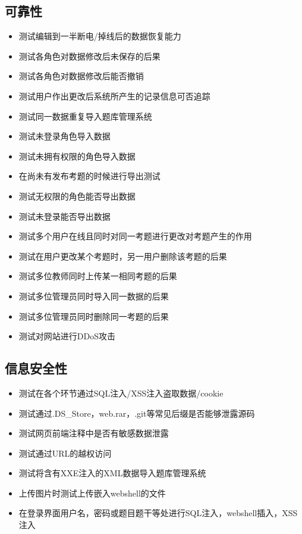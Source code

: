 \documentclass[hyperref, a4paper]{ctexart}
\providecommand{\tightlist}{%
  \setlength{\itemsep}{0pt}\setlength{\parskip}{0pt}}
\begin{document}
\hypertarget{ux53efux9760ux6027}{%
\subsection{可靠性}\label{ux53efux9760ux6027}}

\begin{itemize}
\tightlist
\item
  测试编辑到一半断电/掉线后的数据恢复能力
\item
  测试各角色对数据修改后未保存的后果
\item
  测试各角色对数据修改后能否撤销
\item
  测试用户作出更改后系统所产生的记录信息可否追踪
\item
  测试同一数据重复导入题库管理系统
\item
  测试未登录角色导入数据
\item
  测试未拥有权限的角色导入数据
\item
  在尚未有发布考题的时候进行导出测试
\item
  测试无权限的角色能否导出数据
\item
  测试未登录能否导出数据
\item
  测试多个用户在线且同时对同一考题进行更改对考题产生的作用
\item
  测试在用户更改某个考题时，另一用户删除该考题的后果
\item
  测试多位教师同时上传某一相同考题的后果
\item
  测试多位管理员同时导入同一数据的后果
\item
  测试多位管理员同时删除同一考题的后果
\item
  测试对网站进行DDoS攻击
\end{itemize}

\hypertarget{ux4fe1ux606fux5b89ux5168ux6027}{%
\subsection{信息安全性}\label{ux4fe1ux606fux5b89ux5168ux6027}}

\begin{itemize}
\tightlist
\item
  测试在各个环节通过SQL注入/XSS注入盗取数据/cookie
\item
  测试通过.DS\_Store，web.rar，.git等常见后缀是否能够泄露源码
\item
  测试网页前端注释中是否有敏感数据泄露
\item
  测试通过URL的越权访问
\item
  测试将含有XXE注入的XML数据导入题库管理系统
\item
  上传图片时测试上传嵌入webshell的文件
\item
  在登录界面用户名，密码或题目题干等处进行SQL注入，webshell插入，XSS注入
\end{itemize}
\end{document}
